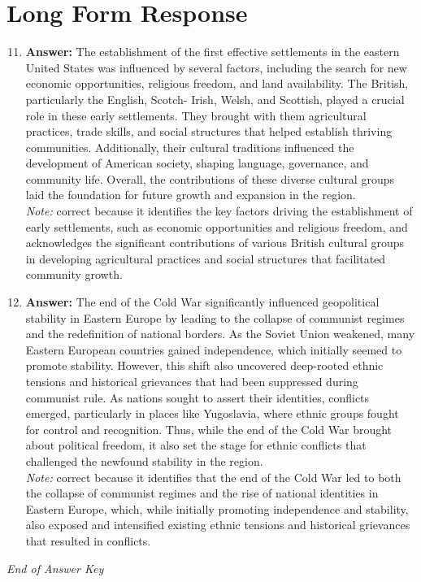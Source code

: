 \documentclass[12pt]{article}
\begin{document}
\section*{Long Form Response}
\begin{enumerate}[label=\arabic*.]
\setcounter{enumi}{10}
\item \textbf{Answer:} The establishment of the first effective settlements in the eastern United States was influenced by several factors, including the search for new economic opportunities, religious freedom, and land availability. The British, particularly the English, Scotch- Irish, Welsh, and Scottish, played a crucial role in these early settlements. They brought with them agricultural practices, trade skills, and social structures that helped establish thriving communities. Additionally, their cultural traditions influenced the development of American society, shaping language, governance, and community life. Overall, the contributions of these diverse cultural groups laid the foundation for future growth and expansion in the region.
\\ \textit{Note:} correct because it identifies the key factors driving the establishment of early settlements, such as economic opportunities and religious freedom, and acknowledges the significant contributions of various British cultural groups in developing agricultural practices and social structures that facilitated community growth.
\item \textbf{Answer:} The end of the Cold War significantly influenced geopolitical stability in Eastern Europe by leading to the collapse of communist regimes and the redefinition of national borders. As the Soviet Union weakened, many Eastern European countries gained independence, which initially seemed to promote stability. However, this shift also uncovered deep-rooted ethnic tensions and historical grievances that had been suppressed during communist rule. As nations sought to assert their identities, conflicts emerged, particularly in places like Yugoslavia, where ethnic groups fought for control and recognition. Thus, while the end of the Cold War brought about political freedom, it also set the stage for ethnic conflicts that challenged the newfound stability in the region.
\\ \textit{Note:} correct because it identifies that the end of the Cold War led to both the collapse of communist regimes and the rise of national identities in Eastern Europe, which, while initially promoting independence and stability, also exposed and intensified existing ethnic tensions and historical grievances that resulted in conflicts.
\end{enumerate}

\vfill
\noindent\textit{End of Answer Key}
\end{document}
